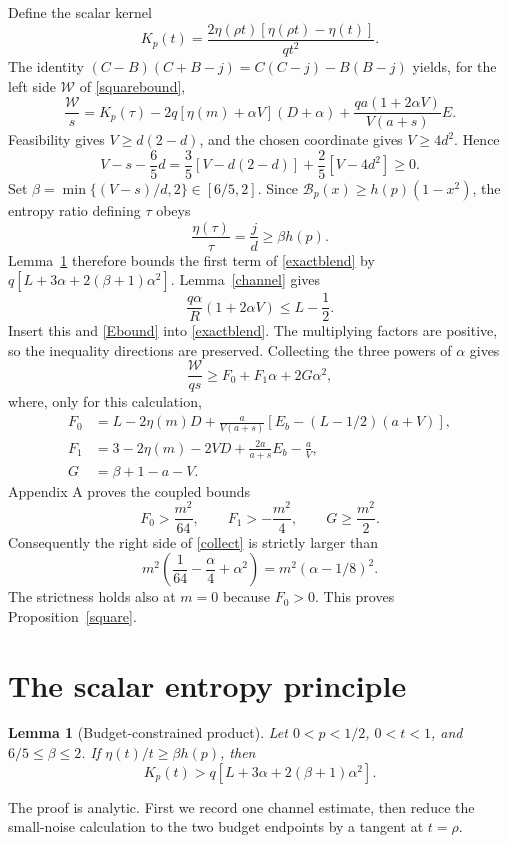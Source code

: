\documentclass[11pt]{article}
\newtheorem{lemma}[theorem]{Lemma}
\newcommand{\B}{\mathcal B_p}\newcommand{\dd}{\,\mathrm d}
\numberwithin{equation}{section}
\begin{document}
Define the scalar kernel
\begin{equation}\label{kernel}
 K_p(t)=\frac{2\eta(\rho t)[\eta(\rho t)-\eta(t)]}{qt^2}.
\end{equation}
The identity $(C-B)(C+B-j)=C(C-j)-B(B-j)$ yields, for the left side $\mathcal W$ of \eqref{squarebound},
\begin{equation}\label{exactblend}
 \frac{\mathcal W}s=K_p(\tau)-2q[\eta(m)+\alpha V](D+\alpha)
 +\frac{qa(1+2\alpha V)}{V(a+s)}E.
\end{equation}
Feasibility gives $V\ge d(2-d)$, and the chosen coordinate gives $V\ge4d^2$. Hence
\[
 V-s-\frac65d
 =\frac35[V-d(2-d)]+\frac25[V-4d^2]\ge0.
\]
Set $\beta=\min\{(V-s)/d,2\}\in[6/5,2]$. Since $\B(x)\ge h(p)(1-x^2)$, the entropy ratio defining $\tau$ obeys
\[
 \frac{\eta(\tau)}\tau=\frac jd\ge\beta h(p).
\]
Lemma~\ref{product} therefore bounds the first term of \eqref{exactblend} by
$q[L+3\alpha+2(\beta+1)\alpha^2]$. Lemma~\ref{channel} gives
\[
 \frac{q\alpha}R(1+2\alpha V)\le L-\frac12.
\]
Insert this and \eqref{Ebound} into \eqref{exactblend}. The multiplying factors are positive, so the inequality directions are preserved. Collecting the three powers of $\alpha$ gives
\begin{equation}\label{collect}
 \frac{\mathcal W}{qs}\ge F_0+F_1\alpha+2G\alpha^2,
\end{equation}
where, only for this calculation,
\begin{align*}
 F_0&=L-2\eta(m)D+\frac{a}{V(a+s)}[E_b-(L-1/2)(a+V)],\\
 F_1&=3-2\eta(m)-2VD+\frac{2a}{a+s}E_b-\frac aV,\\
 G&=\beta+1-a-V.
\end{align*}
Appendix A proves the coupled bounds
\[
 F_0>\frac{m^2}{64},\qquad F_1> -\frac{m^2}{4},\qquad G\ge\frac{m^2}{2}.
\]
Consequently the right side of \eqref{collect} is strictly larger than
\[
 m^2\left(\frac1{64}-\frac\alpha4+\alpha^2\right)
 =m^2(\alpha-1/8)^2.
\]
The strictness holds also at $m=0$ because $F_0>0$. This proves Proposition~\ref{square}.

\section{The scalar entropy principle}
\begin{lemma}[Budget-constrained product]\label{product}
Let $0<p<1/2$, $0<t<1$, and $6/5\le\beta\le2$. If $\eta(t)/t\ge\beta h(p)$, then
\begin{equation}\label{productgoal}
 K_p(t)>q[L+3\alpha+2(\beta+1)\alpha^2].
\end{equation}
\end{lemma}
The proof is analytic. First we record one channel estimate, then reduce the small-noise calculation to the two budget endpoints by a tangent at $t=\rho$.
\end{document}
